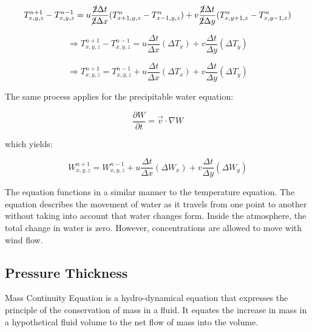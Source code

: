 \begin{equation}
    T^{n + 1}_{x, y, z} - T^{n - 1}_{x, y, z} = u \frac{\cancel{2} \Delta t}{\cancel{2} \Delta x} (T^{n}_{x+1, y, z} - T^{n}_{x-1, y, z}) + v \frac{\cancel{2} \Delta t}{\cancel{2} \Delta y} (T^{n}_{x, y+1, z} - T^{n}_{x, y-1, z})
\end{equation}

\begin{equation}
    \Rightarrow T^{n + 1}_{x, y, z} - T^{n - 1}_{x, y, z} = u \frac{\Delta t}{\Delta x} (\Delta T_{x})
    + v \frac{\Delta t}{\Delta y} (\Delta T_{y})
\end{equation}

\begin{equation}
    \Rightarrow T^{n + 1}_{x, y, z} = T^{n - 1}_{x, y, z} + u \frac{\Delta t}{\Delta x} (\Delta T_{x})
    + v \frac{\Delta t}{\Delta y} (\Delta T_{y})
\end{equation}

The same process applies for the precipitable water equation:

\begin{equation}
    \frac{\partial W}{\partial t} = \Vec{v} \cdot \nabla W
\end{equation}

which yields:

\begin{equation}
    W^{n + 1}_{x, y, z} = W^{n - 1}_{x, y, z} + u \frac{\Delta t}{\Delta x} (\Delta W_{x})
    + v \frac{\Delta t}{\Delta y} (\Delta W_{y})
\end{equation}

The equation functions in a similar manner to the temperature equation. The equation describes the movement of water as it travels from one point to another without taking into account that water changes form. Inside the atmosphere, the total change in water is zero. However, concentrations are allowed to move with wind flow\cite{primitive_equations}.

\subsection{Pressure Thickness}\label{mass_continuity}
\begin{definition}
Mass Continuity Equation is a hydro-dynamical equation that expresses the principle of the conservation of mass in a fluid. It equates the increase in mass in a hypothetical fluid volume to the net flow of mass into the volume.
\end{definition}

